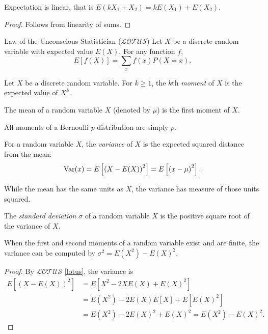 \begin{prop}
    Expectation is linear, that is $E(kX_1+X_2) = kE(X_1) + E(X_2)$.
\end{prop}

\begin{proof}
    Follows from linearity of sums.
\end{proof}

\begin{thm}{Law of the Unconscious Statistician ($\mathcal{LOTUS}$)}{\label{lotus}}\proofbreak
    Let $X$ be a discrete random variable with expected value $E(X)$. For any function $f$, \[E[f(X)] = \sum_{x}f(x)P(X=x).\]
\end{thm}

\begin{defn}
    Let $X$ be a discrete random variable. For $k \geq 1$, the $k$th \emph{moment} of $X$ is the expected value of $X^k$.
\end{defn}

\begin{rmk}
    The mean of a random variable $X$ (denoted by $\mu$) is the first moment of $X$.
\end{rmk}

\begin{exmp}
    All moments of a Bernoulli $p$ distribution are simply $p$.
\end{exmp}

\begin{defn}
    For a random variable $X$, the \emph{variance} of $X$ is the expected squared distance from the mean: \[\operatorname{Var}(x) = E\left[\left(X-E(X)\right)^2\right] = E\left[\left(x - \mu\right)^2\right].\]
\end{defn}

\begin{rmk}
    While the mean has the same units as $X$, the variance has measure of those units squared.
\end{rmk}

\begin{defn}
    The \emph{standard deviation} $\sigma$ of a random variable $X$ is the positive square root of the variance of $X$.
\end{defn}

\begin{prop}
    When the first and second moments of a random variable exist and are finite, the variance can be computed by $\sigma^2 = E(X^2) - E(X)^2$.
\end{prop}

\begin{proof}
    By $\mathcal{LOTUS}$ \ref{lotus}, the variance is
    \begin{align*}
        E\left[(X-E(X))^2\right] &= E\left[X^2 - 2XE(X) + E(X)^2\right] \\
        &= E(X^2) - 2E(X)E\left[X\right] + E\left[E(X)^2\right] \\
        &= E(X^2) - 2E(X)^2 + E(X)^2 = E(X^2) - E(X)^2.
    \end{align*}
\end{proof}


